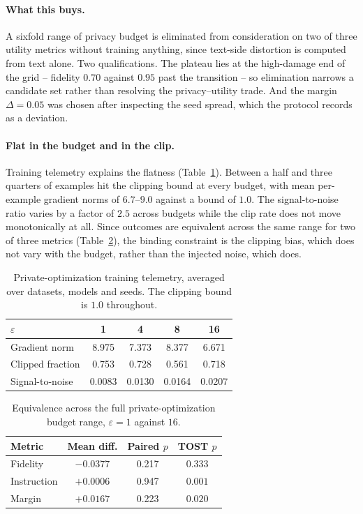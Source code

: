 \paragraph{What this buys.}
A sixfold range of privacy budget is eliminated from consideration on two of three utility metrics without training anything,
since text-side distortion is computed from text alone.
Two qualifications.
The plateau lies at the high-damage end of the grid -- fidelity $0.70$ against $0.95$ past the transition -- so elimination narrows a candidate set rather than resolving the privacy--utility trade.
And the margin $\Delta = 0.05$ was chosen after inspecting the seed spread,
which the protocol records as a deviation.

\paragraph{\label{apx:clipping}Flat in the budget and in the clip.}
Training telemetry explains the flatness (Table~\ref{tab:clipping}).
Between a half and three quarters of examples hit the clipping bound at every budget,
with mean per-example gradient norms of $6.7$--$9.0$ against a bound of $1.0$.
The signal-to-noise ratio varies by a factor of $2.5$ across budgets while the clip rate does not move monotonically at all.
Since outcomes are equivalent across the same range for two of three metrics (Table~\ref{tab:tostm3}),
the binding constraint is the clipping bias,
which does not vary with the budget,
rather than the injected noise,
which does.

\begin{table}[t]
  \centering
  \caption{Private-optimization training telemetry, averaged over datasets,
  models and seeds.
  The clipping bound is $1.0$ throughout.}
  \label{tab:clipping}
  \begin{tabular}{lcccc}
    \toprule
    $\varepsilon$ & 1 & 4 & 8 & 16 \\
    \midrule
    Gradient norm    & 8.975 & 7.373 & 8.377 & 6.671 \\
    Clipped fraction & 0.753 & 0.728 & 0.561 & 0.718 \\
    Signal-to-noise  & 0.0083 & 0.0130 & 0.0164 & 0.0207 \\
    \bottomrule
  \end{tabular}
\end{table}

\begin{table}[t]
  \centering
  \caption{Equivalence across the full private-optimization budget range,
  $\varepsilon = 1$ against $16$.}
  \label{tab:tostm3}
  \begin{tabular}{lccc}
    \toprule
    Metric & Mean diff. & Paired $p$ & TOST $p$ \\
    \midrule
    Fidelity    & $-0.0377$ & 0.217 & $0.333$ \\
    Instruction & $+0.0006$ & 0.947 & $0.001$ \\
    Margin      & $+0.0167$ & 0.223 & $0.020$ \\
    \bottomrule
  \end{tabular}
\end{table}

